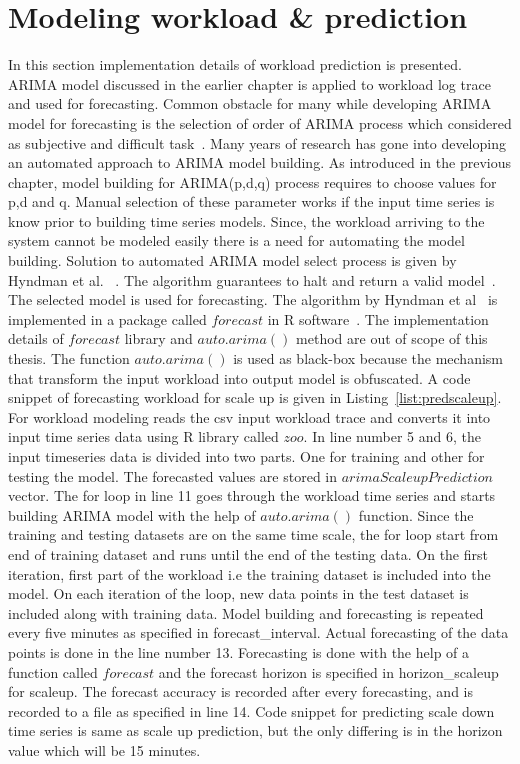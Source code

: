  \section{Modeling workload \& prediction}
\label{sec:implementationprediction}
In this section implementation details of workload prediction is presented. ARIMA model discussed in the earlier chapter is applied to workload log trace and used for forecasting. Common obstacle for many while developing ARIMA model for forecasting is the selection of order of ARIMA process which considered as subjective and difficult task~\cite{makridakis2008forecasting}. Many years of research has gone into developing an automated approach to ARIMA model building. As introduced in the previous chapter, model building for ARIMA(p,d,q) process requires to choose values for p,d and q. Manual selection  of these parameter works if the input time series is know prior to building time series models. Since, the workload arriving to the system cannot be modeled easily there is a need for automating the model building. Solution to automated ARIMA model select process is given by Hyndman et al. ~\cite{hyndman2007automatic}. The algorithm guarantees to halt and return a valid model~\cite{hyndman2007automatic}. The selected model is used for forecasting. The algorithm by Hyndman et al~\cite{hyndman2007automatic} is implemented in a package called \(forecast\) in R software~\cite{rstat}. The implementation details of \(forecast\) library  and \(auto.arima()\) method are out of scope of this thesis. The function \(auto.arima()\) is used as black-box because the mechanism that transform the input workload into output model is obfuscated. A code snippet of forecasting workload for scale up is given in Listing~\ref{list:predscaleup}. For workload modeling reads the csv input workload trace and converts it into input time series data using R library called \(zoo\). In line number 5 and 6, the input timeseries data is divided into two parts. One for training and other for testing the model. The forecasted values are stored in \(arimaScaleupPrediction\) vector. The for loop in line 11 goes through the workload time series and starts building ARIMA model with the help of \(auto.arima()\) function. Since the training and testing datasets are on the same time scale, the for loop start from end of training dataset and runs until the end of the testing data. On the first iteration, first part of the workload i.e the training dataset is included into the model. On each iteration of the loop, new data points in the test dataset is included along with training data. Model building and forecasting is repeated every five minutes as specified in forecast\_interval. Actual forecasting of the data points is done in the line number 13. Forecasting is done with the help of a function called \(forecast\) and the forecast horizon is specified in horizon\_scaleup for scaleup. The forecast accuracy is recorded after every forecasting, and is recorded to a file as specified in line 14. Code snippet for predicting scale down time series is same as scale up prediction, but the only differing is in the horizon value which will be 15 minutes.
